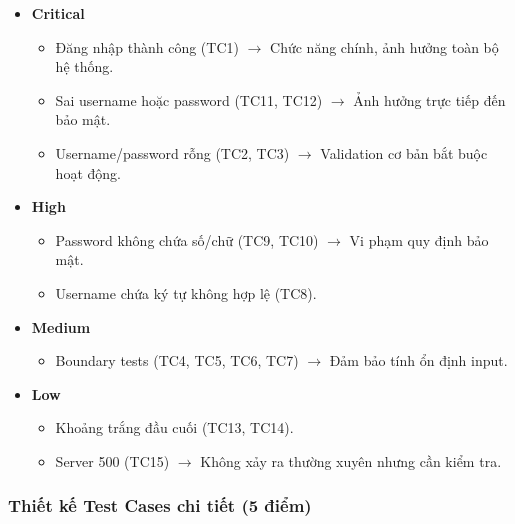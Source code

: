 \documentclass[a4paper,12pt]{article}
\begin{document}
\begin{itemize}
    \item \textbf{Critical}
    \begin{itemize}
        \item Đăng nhập thành công (TC1) $\rightarrow$ Chức năng chính, ảnh hưởng toàn bộ hệ thống.
        \item Sai username hoặc password (TC11, TC12) $\rightarrow$ Ảnh hưởng trực tiếp đến bảo mật.
        \item Username/password rỗng (TC2, TC3) $\rightarrow$ Validation cơ bản bắt buộc hoạt động.
    \end{itemize}
    \item \textbf{High}
    \begin{itemize}
        \item Password không chứa số/chữ (TC9, TC10) $\rightarrow$ Vi phạm quy định bảo mật.
        \item Username chứa ký tự không hợp lệ (TC8).
    \end{itemize}
    \item \textbf{Medium}
    \begin{itemize}
        \item Boundary tests (TC4, TC5, TC6, TC7) $\rightarrow$ Đảm bảo tính ổn định input.
    \end{itemize}
    \item \textbf{Low}
    \begin{itemize}
        \item Khoảng trắng đầu cuối (TC13, TC14).
        \item Server 500 (TC15) $\rightarrow$ Không xảy ra thường xuyên nhưng cần kiểm tra.
    \end{itemize}
\end{itemize}

\subsubsection{Thiết kế Test Cases chi tiết (5 điểm)}
\end{document}
